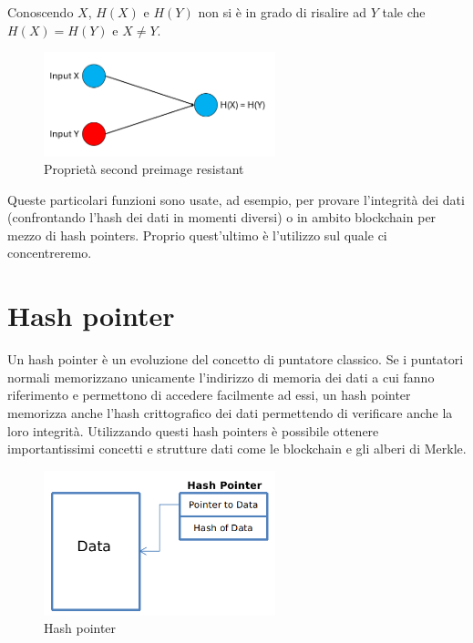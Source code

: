 \documentclass[12pt]{report}
\begin{document}
\begin{itemize}[topsep=5pt, itemsep=0pt]
    Conoscendo \(X\), \(H(X)\) e \(H(Y)\) non si è in grado di risalire ad \(Y\) tale che \(H(X) = H(Y)\) e \(X \neq Y\).
    \begin{figure}[H]
        \centering
        \includegraphics[width=0.6\textwidth]{Second preimage resistant.PNG}
        \captionsetup{justification=centering}
        \caption{Proprietà second preimage resistant \cite{Uno}}
        \label{fig:secondpreimageresistant}
    \end{figure}
\end{itemize}
Queste particolari funzioni sono usate, ad esempio, per provare l'integrità dei dati (confrontando l'hash dei dati in momenti diversi) o in ambito blockchain per mezzo di hash pointers. Proprio quest'ultimo è l'utilizzo sul quale ci concentreremo. \cite{Uno}\newline

\section{Hash pointer}
Un hash pointer è un evoluzione del concetto di puntatore classico.\newline
Se i puntatori normali memorizzano unicamente l'indirizzo di memoria dei dati a cui fanno riferimento e permettono di accedere facilmente ad essi, un hash pointer memorizza anche l'hash crittografico dei dati permettendo di verificare anche la loro integrità. Utilizzando questi hash pointers è possibile ottenere importantissimi concetti e strutture dati come le blockchain e gli alberi di Merkle. \cite{Due}\newline
\begin{figure}[H]
    \centering
    \includegraphics[width=0.6\textwidth]{Hash pointer.png}
    \captionsetup{justification=centering}
    \caption{Hash pointer \cite{Tre}}
    \label{fig:hashpointer}
\end{figure}
\end{document}
